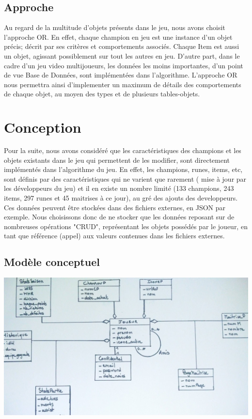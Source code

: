 \documentclass[a4paper,10pt]{report}
\begin{document}
\section{Approche}
  Au regard de la multitude d'objets présents dans le jeu, nous avons choisit l'approche OR. En effet, chaque champion en jeu est une instance d'un objet précis; décrit par ses critères et comportements associés. Chaque Item est aussi un objet, agissant possiblement sur tout les autres en jeu. D'autre part, dans le cadre d'un jeu video multijoueurs, les données les moins importantes, d'un point de vue Base de Données, sont implémentées dans l'algorithme.  L'approche OR nous permettra ainsi d'implementer un maximum de détails des comportements de chaque objet, au moyen des types et de plusieurs tables-objets.


\chapter{Conception}
Pour la suite, nous avons considéré que les caractéristiques des champions et les objets existants dans le jeu qui permettent  de les modifier, sont directement implémentés dans l'algorithme  du jeu. En effet, les champions, runes, items, etc, sont définis par des caractéristiques qui ne varient que rarement ( mise à jour par les développeurs du jeu) et il en existe un nombre limité (133 champions, 243 items, 297 runes et 45 maitrises à ce jour), au gré des ajouts des developpeurs. Ces données peuvent être stockées dans des fichiers externes, en JSON par exemple. Nous choisissons donc de ne stocker que les données reposant sur de nombreuses opérations "CRUD", représentant les objets possédés par le joueur, en tant que référence (appel) aux valeurs contenues dans les fichiers externes.

\section{Modèle conceptuel}
\includegraphics[scale=0.2]{uml.jpg}
\newpage
\end{document}
